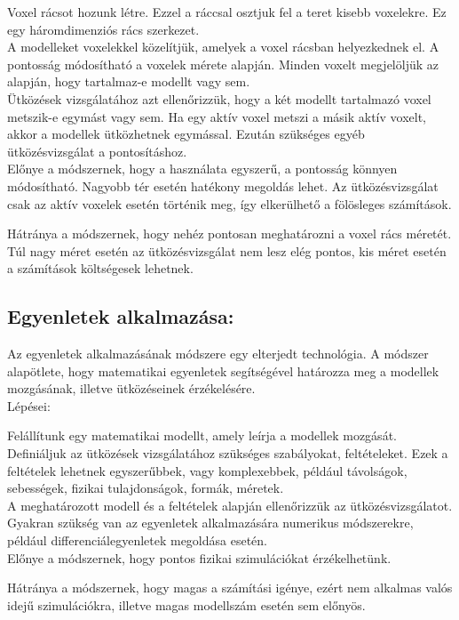 \textbullet Voxel rácsot hozunk létre. Ezzel a ráccsal osztjuk fel a teret kisebb voxelekre. Ez egy háromdimenziós rács szerkezet.\\

\textbullet A modelleket voxelekkel közelítjük, amelyek a voxel rácsban helyezkednek el. A pontosság módosítható a voxelek mérete alapján. Minden voxelt megjelöljük az alapján, hogy tartalmaz-e modellt vagy sem.\\

\textbullet Ütközések vizsgálatához azt ellenőrizzük, hogy a két modellt tartalmazó voxel metszik-e egymást vagy sem. Ha egy aktív voxel metszi a másik aktív voxelt, akkor a modellek ütközhetnek egymással. Ezután szükséges egyéb ütközésvizsgálat a pontosításhoz.\\

Előnye a módszernek, hogy a használata egyszerű, a pontosság könnyen módosítható. Nagyobb tér esetén hatékony megoldás lehet. Az ütközésvizsgálat csak az aktív voxelek esetén történik meg, így elkerülhető a fölösleges számítások.

Hátránya a módszernek, hogy nehéz pontosan meghatározni a voxel rács méretét. Túl nagy méret esetén az ütközésvizsgálat nem lesz elég pontos, kis méret esetén a számítások költségesek lehetnek.

\subsection{Egyenletek alkalmazása:}
Az egyenletek alkalmazásának módszere egy elterjedt technológia. A módszer alapötlete, hogy matematikai egyenletek segítségével határozza meg a modellek mozgásának, illetve ütközéseinek érzékelésére.
\\
Lépései:

\textbullet Felállítunk egy matematikai modellt, amely leírja a modellek mozgását.\\

\textbullet Definiáljuk az ütközések vizsgálatához szükséges szabályokat, feltételeket. Ezek a feltételek lehetnek egyszerűbbek, vagy komplexebbek, például távolságok, sebességek, fizikai tulajdonságok, formák, méretek.\\

\textbullet A meghatározott modell és a feltételek alapján ellenőrizzük az ütközésvizsgálatot.\\

\textbullet Gyakran szükség van az egyenletek alkalmazására numerikus módszerekre, például differenciálegyenletek megoldása esetén.\\

Előnye a módszernek, hogy pontos fizikai szimulációkat érzékelhetünk.

Hátránya a módszernek, hogy magas a számítási igénye, ezért nem alkalmas valós idejű szimulációkra, illetve magas modellszám esetén sem előnyös.